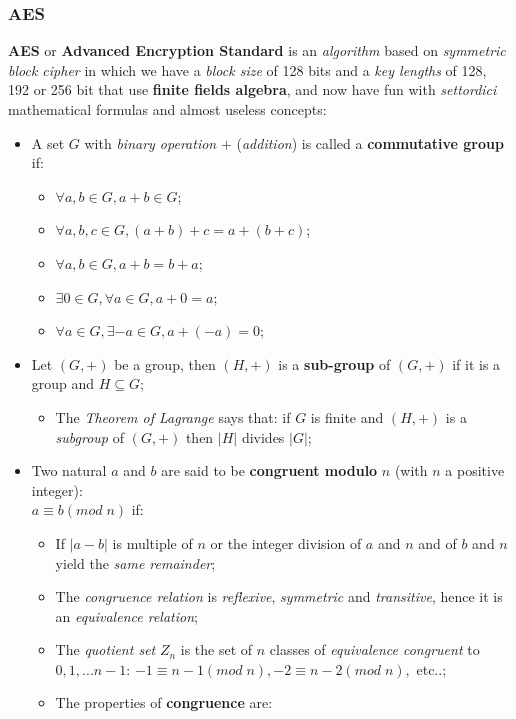 \documentclass{article}
\begin{document}
\subsubsection{AES}
\textbf{AES} or \textbf{Advanced Encryption Standard} is an \emph{algorithm} based on \emph{symmetric block cipher} in which we have a \emph{block size} of 128 bits and a \emph{key lengths} of 128, 192 or 256 bit that use \textbf{finite fields algebra}, and now have fun with \emph{settordici} mathematical formulas and almost useless concepts:
\begin{itemize}
\item A set $G$ with \emph{binary operation} $+$ (\emph{addition}) is called a \textbf{commutative group} if:
\begin{itemize}
\item $\forall a,b \in G, a+b \in G$;
\item $\forall a,b,c \in G, (a+b)+c = a+(b+c)$;
\item $\forall a,b \in G, a+b = b + a$;
\item $\exists 0 \in G, \forall a \in G, a + 0 = a$;
\item $\forall a \in G, \exists -a \in G, a + (-a) = 0$;
\end{itemize}
\item Let $(G,+)$ be a group, then $(H,+)$ is a\textbf{ sub-group} of $(G,+)$ if it is a group and $H\subseteq G$;
\begin{itemize}
\item The \emph{Theorem of Lagrange} says that: if $G$ is finite and $(H,+)$ is a \emph{subgroup} of $(G,+)$ then $|H|$ divides $|G|$;
\end{itemize}
\item Two natural $a$ and $b$ are said to be \textbf{congruent modulo} $n$ (with $n$ a positive integer):\\ $a \equiv b (mod\; n)$ if:
\begin{itemize}
\item If $|a-b|$ is multiple of $n$ or the integer division of $a$ and $n$ and of $b$ and $n$ yield the \emph{same remainder};
\item The \emph{congruence relation} is \emph{reflexive}, \emph{symmetric} and \emph{transitive}, hence it is an \emph{equivalence relation};
\item The \emph{quotient set} $Z_n$ is the set of $n$ classes of \emph{equivalence congruent} to $0, 1,... n-1$: $-1 \equiv n-1 (mod\; n), -2\equiv n-2(mod\; n),$ etc..;
\item The properties of \textbf{congruence} are:

\end{itemize}
\end{itemize}
\end{document}
